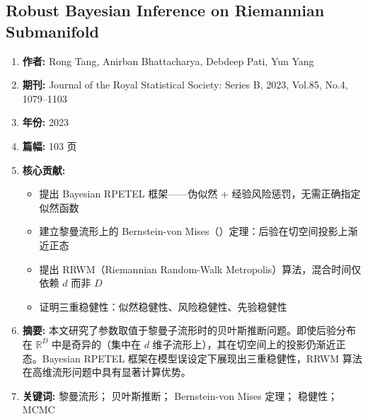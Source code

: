 \subsection{Robust Bayesian Inference on Riemannian Submanifold}
\begin{enumerate}
    \item \textbf{作者:} Rong Tang, Anirban Bhattacharya, Debdeep Pati, Yun Yang
    \item \textbf{期刊:} Journal of the Royal Statistical Society: Series B, 2023, Vol.85, No.4, 1079--1103
    \item \textbf{年份:} 2023
    \item \textbf{篇幅:} 103 页
    \item \textbf{核心贡献:}
        \begin{itemize}
            \item 提出 Bayesian RPETEL 框架——伪似然 + 经验风险惩罚，无需正确指定似然函数
            \item 建立黎曼流形上的 Bernstein-von Mises（\BvM）定理：后验在切空间投影上渐近正态
            \item 提出 RRWM（Riemannian Random-Walk Metropolis）算法，混合时间仅依赖 $d$ 而非 $D$
            \item 证明三重稳健性：似然稳健性、风险稳健性、先验稳健性
        \end{itemize}
    \item \textbf{摘要:} 本文研究了参数取值于黎曼子流形时的贝叶斯推断问题。即使后验分布在 $\mathbb{R}^D$ 中是奇异的（集中在 $d$ 维子流形上），其在切空间上的投影仍渐近正态。Bayesian RPETEL 框架在模型误设定下展现出三重稳健性，RRWM 算法在高维流形问题中具有显著计算优势。
    \item \textbf{关键词:} 黎曼流形； 贝叶斯推断； Bernstein-von Mises 定理； 稳健性； MCMC
\end{enumerate}

